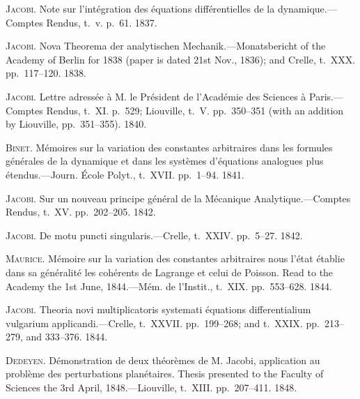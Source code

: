 \documentclass[11pt,a4paper]{book}
\begin{document}
\smallskip

\noindent\textsc{Jacobi}. Note sur l'int\'egration des \'equations diff\'erentielles de la dynamique.---Comptes
Rendus, t.~v. p.~61. 1837.

\smallskip

\noindent\textsc{Jacobi}. Nova Theorema der analytischen Mechanik.---Monatsbericht of the Academy
of Berlin for 1838 (paper is dated 21st Nov., 1836); and Crelle, t.~XXX. pp.~117--120.
1838.

\smallskip

\noindent\textsc{Jacobi}. Lettre adress\'ee \`a M. le Pr\'esident de l'Acad\'emie des Sciences \`a Paris.---
Comptes Rendus, t.~XI. p.~529; Liouville, t.~V. pp.~350--351 (with an addition by
Liouville, pp.~351--355). 1840.

\smallskip

\noindent\textsc{Binet}. M\'emoires sur la variation des constantes arbitraires dans les formules g\'en\'erales
de la dynamique et dans les syst\`emes d'\'equations analogues plus \'etendus.---Journ.
\'Ecole Polyt., t.~XVII. pp.~1--94. 1841.

\smallskip

\noindent\textsc{Jacobi}. Sur un nouveau principe g\'en\'eral de la M\'ecanique Analytique.---Comptes
Rendus, t.~XV. pp.~202--205. 1842.

\smallskip

\noindent\textsc{Jacobi}. De motu puncti singularis.---Crelle, t.~XXIV. pp.~5--27. 1842.

\smallskip

\noindent\textsc{Maurice}. M\'emoire sur la variation des constantes arbitraires nous l'\'etat \'etablie dans
sa g\'en\'eralit\'e les coh\'erents de Lagrange et celui de Poisson. Read to the Academy
the 1st June, 1844.---M\'em. de l'Instit., t.~XIX. pp.~553--628. 1844.

\smallskip

\noindent\textsc{Jacobi}. Theoria novi multiplicatoris systemati \'equations differentialium vulgarium
applicandi.---Crelle, t.~XXVII. pp.~199--268; and t.~XXIX. pp.~213--279, and 333--376.
1844.

\smallskip

\noindent\textsc{Dedeyen}. D\'emonstration de deux th\'eor\`emes de M. Jacobi, application au probl\`eme des
perturbations plan\'etaires. Thesis presented to the Faculty of Sciences the 3rd
April, 1848.---Liouville, t.~XIII. pp.~207--411. 1848.

\smallskip
\end{document}
